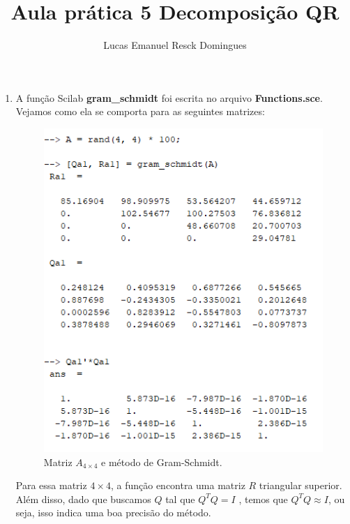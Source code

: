 \documentclass[11pt]{article}
\begin{document}
    \author{Lucas Emanuel Resck Domingues}
    \title{Aula prática 5
    \medbreak
    \large Decomposição QR}
    \maketitle
    
    \medskip
    
    \begin{enumerate}
    
        \item %
        
            A função Scilab \textbf{gram\_schmidt} foi escrita no arquivo \textbf{Functions.sce}. Vejamos como ela se comporta para as seguintes matrizes:
        
            \begin{figure}[H]
                \centering
                \includegraphics[]{1-1}
                \caption{Matriz $A_{4\times4}$ e método de Gram-Schmidt.}
            \end{figure}
        
            Para essa matriz $4\times4$, a função encontra uma matriz $R$ triangular superior. Além disso, dado que buscamos $Q$ tal que $Q^TQ = I$ , temos que $Q^TQ \approx I$, ou seja, isso indica uma boa precisão do método.
        

\end{enumerate}
\end{document}
